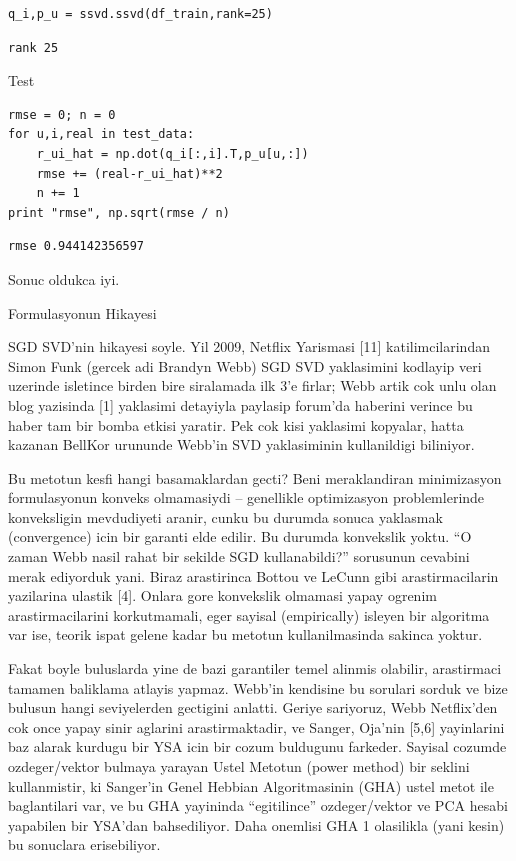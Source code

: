 \documentclass[12pt,fleqn]{article}\usepackage{../common}
\begin{document}
\begin{verbatim}
q_i,p_u = ssvd.ssvd(df_train,rank=25)
\end{verbatim}

\begin{verbatim}
rank 25
\end{verbatim}

Test

\begin{verbatim}
rmse = 0; n = 0
for u,i,real in test_data:
    r_ui_hat = np.dot(q_i[:,i].T,p_u[u,:])
    rmse += (real-r_ui_hat)**2
    n += 1
print "rmse", np.sqrt(rmse / n)
\end{verbatim}

\begin{verbatim}
rmse 0.944142356597
\end{verbatim}

Sonuc oldukca iyi.

Formulasyonun Hikayesi

SGD SVD'nin hikayesi soyle. Yil 2009, Netflix Yarismasi [11]
katilimcilarindan Simon Funk (gercek adi Brandyn Webb) SGD SVD yaklasimini
kodlayip veri uzerinde isletince birden bire siralamada ilk 3'e firlar;
Webb artik cok unlu olan blog yazisinda [1] yaklasimi detayiyla paylasip
forum'da haberini verince bu haber tam bir bomba etkisi yaratir. Pek cok
kisi yaklasimi kopyalar, hatta kazanan BellKor urununde Webb'in SVD
yaklasiminin kullanildigi biliniyor.

Bu metotun kesfi hangi basamaklardan gecti? Beni meraklandiran minimizasyon
formulasyonun konveks olmamasiydi -- genellikle optimizasyon problemlerinde
konveksligin mevdudiyeti aranir, cunku bu durumda sonuca yaklasmak
(convergence) icin bir garanti elde edilir. Bu durumda konvekslik
yoktu. ``O zaman Webb nasil rahat bir sekilde SGD kullanabildi?'' sorusunun
cevabini merak ediyorduk yani. Biraz arastirinca Bottou ve LeCunn gibi
arastirmacilarin yazilarina ulastik [4]. Onlara gore konvekslik olmamasi
yapay ogrenim arastirmacilarini korkutmamali, eger sayisal (empirically)
isleyen bir algoritma var ise, teorik ispat gelene kadar bu metotun
kullanilmasinda sakinca yoktur.

Fakat boyle buluslarda yine de bazi garantiler temel alinmis olabilir,
arastirmaci tamamen baliklama atlayis yapmaz. Webb'in kendisine bu sorulari
sorduk ve bize bulusun hangi seviyelerden gectigini anlatti. Geriye
sariyoruz, Webb Netflix'den cok once yapay sinir aglarini arastirmaktadir,
ve Sanger, Oja'nin [5,6] yayinlarini baz alarak kurdugu bir YSA icin bir
cozum buldugunu farkeder. Sayisal cozumde ozdeger/vektor bulmaya yarayan
Ustel Metotun (power method) bir seklini kullanmistir, ki Sanger'in Genel
Hebbian Algoritmasinin (GHA) ustel metot ile baglantilari var, ve bu GHA
yayininda ``egitilince'' ozdeger/vektor ve PCA hesabi yapabilen bir YSA'dan
bahsediliyor. Daha onemlisi GHA 1 olasilikla (yani kesin) bu sonuclara
erisebiliyor.
\end{document}
